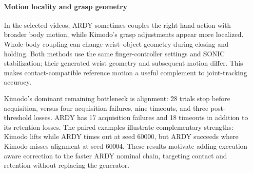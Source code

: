 \paragraph{Motion locality and grasp geometry}
In the selected videos, ARDY sometimes couples the right-hand action with broader body motion, while Kimodo's grasp adjustments appear more localized. Whole-body coupling can change wrist--object geometry during closing and holding. Both methods use the same finger-controller settings and SONIC stabilization; their generated wrist geometry and subsequent motion differ. This makes contact-compatible reference motion a useful complement to joint-tracking accuracy.

Kimodo's dominant remaining bottleneck is alignment: 28 trials stop before acquisition, versus four acquisition failures, nine timeouts, and three post-threshold losses. ARDY has 17 acquisition failures and 18 timeouts in addition to its retention losses. The paired examples illustrate complementary strengths: Kimodo lifts while ARDY times out at seed 60000, but ARDY succeeds where Kimodo misses alignment at seed 60004. These results motivate adding execution-aware correction to the faster ARDY nominal chain, targeting contact and retention without replacing the generator.
